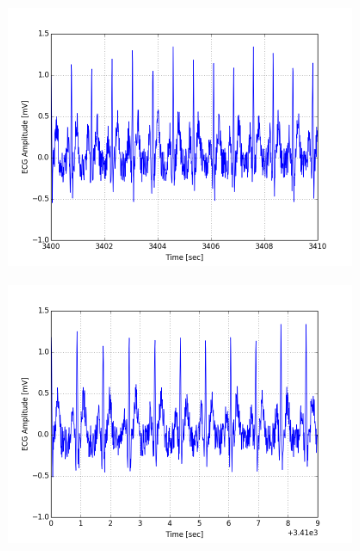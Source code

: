 \documentclass[paper=a4, fontsize=11pt]{scrartcl}
\numberwithin{equation}{section}		%
\numberwithin{figure}{section}			%
\numberwithin{table}{section}		    %
\begin{document}
\begin{appendices}
\begin{figure}[H]
	\centering
	\begin{subfigure}[b]{0.3\textwidth}
		\includegraphics[width=\textwidth]{sim/ecg_76}
	\end{subfigure}
	\begin{subfigure}[b]{0.3\textwidth}
		\includegraphics[width=\textwidth]{sim/ecg_77}
	\end{subfigure}
\end{figure}

\end{appendices}  

\newpage
 

	
\end{document}
